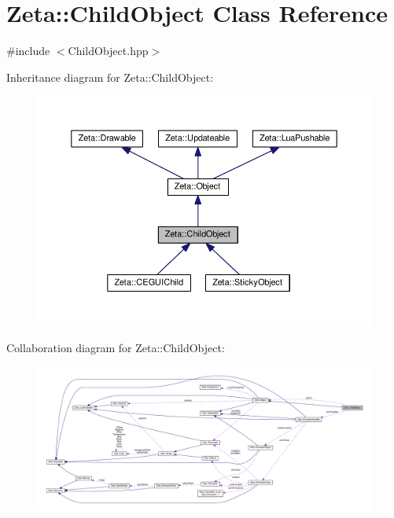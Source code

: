 \hypertarget{classZeta_1_1ChildObject}{\section{Zeta\+:\+:Child\+Object Class Reference}
\label{classZeta_1_1ChildObject}
}


{\ttfamily \#include $<$Child\+Object.\+hpp$>$}



Inheritance diagram for Zeta\+:\+:Child\+Object\+:\nopagebreak
\begin{figure}[H]
\begin{center}
\leavevmode
\includegraphics[width=350pt]{classZeta_1_1ChildObject__inherit__graph}
\end{center}
\end{figure}


Collaboration diagram for Zeta\+:\+:Child\+Object\+:
\nopagebreak
\begin{figure}[H]
\begin{center}
\leavevmode
\includegraphics[width=350pt]{classZeta_1_1ChildObject__coll__graph}
\end{center}
\end{figure}
